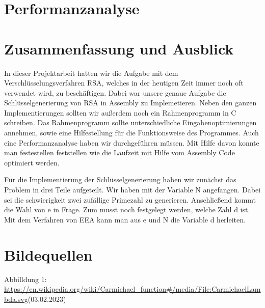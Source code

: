\documentclass[course=asp]{aspdoc}
\begin{document}
\section{Performanzanalyse}


\section{Zusammenfassung und Ausblick}
In dieser Projektarbeit hatten wir die Aufgabe mit dem Verschlüsselungsverfahren RSA, welches in der heutigen Zeit immer noch oft verwendet wird, zu beschäftigen. Dabei war unsere genaue Aufgabe die Schlüsselgenerierung von RSA in Assembly zu Implemetieren. Neben den ganzen Implementierungen sollten wir außerdem noch ein Rahmenprogramm in C schreiben. Das Rahmenprogramm sollte unterschiedliche Eingabenoptimierungen annehmen, sowie eine Hilfestellung für die Funktionsweise des Programmes. Auch eine Performanzanalyse haben wir durchgeführen müssen. Mit Hilfe davon konnte man festestellen feststellen wie die Laufzeit mit Hilfe vom Assembly Code optimiert werden. 

Für die Implementierung der Schlüsselgenerierung haben wir zunächst das Problem in drei Teile aufgeteilt. Wir haben mit der Variable N angefangen. Dabei sei die schwierigkeit zwei zufällige Primezahl zu generieren. Anschließend kommt die Wahl von e in Frage. Zum musst noch festgelegt werden, welche Zahl d ist. Mit dem Verfahren von EEA kann man aus e und N die Variable d herleiten. 

\section{Bildequellen}
Abbilldung 1: \url{https://en.wikipedia.org/wiki/Carmichael_function#/media/File:CarmichaelLambda.svg}(03.02.2023)


{}
\end{document}
